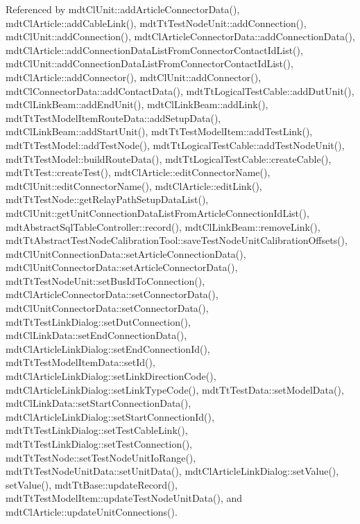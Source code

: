 Referenced by mdt\-Cl\-Unit\-::add\-Article\-Connector\-Data(), mdt\-Cl\-Article\-::add\-Cable\-Link(), mdt\-Tt\-Test\-Node\-Unit\-::add\-Connection(), mdt\-Cl\-Unit\-::add\-Connection(), mdt\-Cl\-Article\-Connector\-Data\-::add\-Connection\-Data(), mdt\-Cl\-Article\-::add\-Connection\-Data\-List\-From\-Connector\-Contact\-Id\-List(), mdt\-Cl\-Unit\-::add\-Connection\-Data\-List\-From\-Connector\-Contact\-Id\-List(), mdt\-Cl\-Article\-::add\-Connector(), mdt\-Cl\-Unit\-::add\-Connector(), mdt\-Cl\-Connector\-Data\-::add\-Contact\-Data(), mdt\-Tt\-Logical\-Test\-Cable\-::add\-Dut\-Unit(), mdt\-Cl\-Link\-Beam\-::add\-End\-Unit(), mdt\-Cl\-Link\-Beam\-::add\-Link(), mdt\-Tt\-Test\-Model\-Item\-Route\-Data\-::add\-Setup\-Data(), mdt\-Cl\-Link\-Beam\-::add\-Start\-Unit(), mdt\-Tt\-Test\-Model\-Item\-::add\-Test\-Link(), mdt\-Tt\-Test\-Model\-::add\-Test\-Node(), mdt\-Tt\-Logical\-Test\-Cable\-::add\-Test\-Node\-Unit(), mdt\-Tt\-Test\-Model\-::build\-Route\-Data(), mdt\-Tt\-Logical\-Test\-Cable\-::create\-Cable(), mdt\-Tt\-Test\-::create\-Test(), mdt\-Cl\-Article\-::edit\-Connector\-Name(), mdt\-Cl\-Unit\-::edit\-Connector\-Name(), mdt\-Cl\-Article\-::edit\-Link(), mdt\-Tt\-Test\-Node\-::get\-Relay\-Path\-Setup\-Data\-List(), mdt\-Cl\-Unit\-::get\-Unit\-Connection\-Data\-List\-From\-Article\-Connection\-Id\-List(), mdt\-Abstract\-Sql\-Table\-Controller\-::record(), mdt\-Cl\-Link\-Beam\-::remove\-Link(), mdt\-Tt\-Abstract\-Test\-Node\-Calibration\-Tool\-::save\-Test\-Node\-Unit\-Calibration\-Offsets(), mdt\-Cl\-Unit\-Connection\-Data\-::set\-Article\-Connection\-Data(), mdt\-Cl\-Unit\-Connector\-Data\-::set\-Article\-Connector\-Data(), mdt\-Tt\-Test\-Node\-Unit\-::set\-Bus\-Id\-To\-Connection(), mdt\-Cl\-Article\-Connector\-Data\-::set\-Connector\-Data(), mdt\-Cl\-Unit\-Connector\-Data\-::set\-Connector\-Data(), mdt\-Tt\-Test\-Link\-Dialog\-::set\-Dut\-Connection(), mdt\-Cl\-Link\-Data\-::set\-End\-Connection\-Data(), mdt\-Cl\-Article\-Link\-Dialog\-::set\-End\-Connection\-Id(), mdt\-Tt\-Test\-Model\-Item\-Data\-::set\-Id(), mdt\-Cl\-Article\-Link\-Dialog\-::set\-Link\-Direction\-Code(), mdt\-Cl\-Article\-Link\-Dialog\-::set\-Link\-Type\-Code(), mdt\-Tt\-Test\-Data\-::set\-Model\-Data(), mdt\-Cl\-Link\-Data\-::set\-Start\-Connection\-Data(), mdt\-Cl\-Article\-Link\-Dialog\-::set\-Start\-Connection\-Id(), mdt\-Tt\-Test\-Link\-Dialog\-::set\-Test\-Cable\-Link(), mdt\-Tt\-Test\-Link\-Dialog\-::set\-Test\-Connection(), mdt\-Tt\-Test\-Node\-::set\-Test\-Node\-Unit\-Io\-Range(), mdt\-Tt\-Test\-Node\-Unit\-Data\-::set\-Unit\-Data(), mdt\-Cl\-Article\-Link\-Dialog\-::set\-Value(), set\-Value(), mdt\-Tt\-Base\-::update\-Record(), mdt\-Tt\-Test\-Model\-Item\-::update\-Test\-Node\-Unit\-Data(), and mdt\-Cl\-Article\-::update\-Unit\-Connections().

